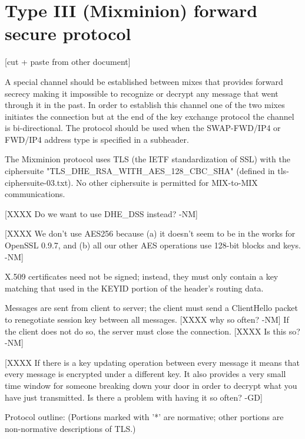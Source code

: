 \section{Type III (Mixminion) forward secure protocol}

[cut + paste from other document]

A special channel should be established between mixes that provides
forward secrecy making it impossible to recognize or decrypt any
message that went through it in the past. In order to establish this
channel one of the two mixes initiates the connection but at the end
of the key exchange protocol the channel is bi-directional. The
protocol should be used when the SWAP-FWD/IP4 or FWD/IP4 address type
is specified in a subheader.

The Mixminion protocol uses TLS (the IETF standardization of SSL) with
the ciphersuite "TLS_DHE_RSA_WITH_AES_128_CBC_SHA" (defined in
tls-ciphersuite-03.txt).  No other ciphersuite is permitted for
MIX-to-MIX communications.

  [XXXX Do we want to use DHE_DSS instead? -NM]

  [XXXX We don't use AES256 because (a) it doesn't seem to be in
        the works for OpenSSL 0.9.7, and (b) all our other AES
        operations use 128-bit blocks and keys. -NM]

X.509 certificates need not be signed; instead, they must only contain
a key matching that used in the KEYID portion of the header's routing
data.  

Messages are sent from client to server; the client must send a
ClientHello packet to renegotiate session key between all
messages. [XXXX why so often? -NM] If the client does not do so, the
server must close the connection.  [XXXX Is this so? -NM]

[XXXX If there is a key updating operation between every message it means
that every message is encrypted under a different key. It also
provides a very small time window for someone breaking down your door
in order to decrypt what you have just transmitted. Is there a problem
with having it so often? -GD]

Protocol outline: (Portions marked with '*' are normative; other
portions are non-normative descriptions of TLS.)

